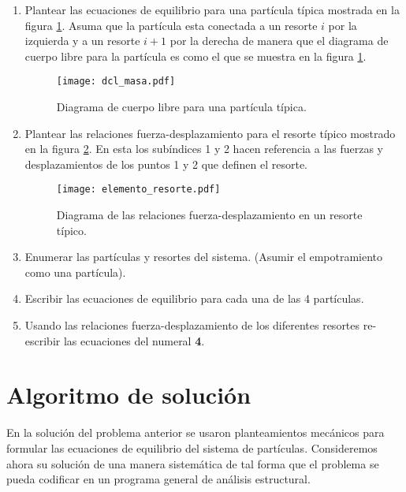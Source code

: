 \begin{enumerate}

\item
Plantear las ecuaciones de equilibrio para una partícula típica mostrada en 
la figura \ref{fig:dcl_masa}. Asuma que la partícula esta conectada a un 
resorte $i$ por la izquierda y a un resorte $i+1$ por la derecha de manera que 
el diagrama de cuerpo libre para la partícula es como el que se muestra en la 
figura \ref{fig:dcl_masa}.

\begin{figure}[H]
\centering
\texttt{[image: dcl\_masa.pdf]}
\caption{Diagrama de cuerpo libre para una partícula típica.}
\label{fig:dcl_masa}
\end{figure}

\item
Plantear las relaciones fuerza-desplazamiento para el resorte típico 
mostrado en la figura \ref{fig:elemento_resorte}. En esta los subíndices 1 y 2 
hacen referencia a las fuerzas y desplazamientos de los puntos 1 y 2 que 
definen el resorte.
\begin{figure}[H]
\centering
\texttt{[image: elemento\_resorte.pdf]}
\caption{Diagrama de las relaciones fuerza-desplazamiento en un resorte 
típico.}
\label{fig:elemento_resorte}
\end{figure}

\item
Enumerar las partículas y resortes del sistema. (Asumir el empotramiento 
como una partícula).

\item
Escribir las ecuaciones de equilibrio para cada una de las 4 partículas.

\item
Usando las relaciones fuerza-desplazamiento de los diferentes resortes 
re-escribir las ecuaciones del numeral \textbf{4}.

\end{enumerate}

\section{Algoritmo de solución}

En la solución del problema anterior se usaron planteamientos mecánicos para 
formular las ecuaciones de equilibrio del sistema de partículas. Consideremos 
ahora su solución de una manera sistemática de tal forma que el problema se 
pueda codificar en un programa general de análisis estructural.


